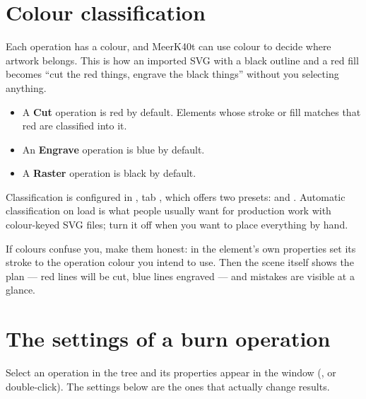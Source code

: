 \section{Colour classification}

Each operation has a colour, and MeerK40t can use colour to decide where artwork
belongs. This is how an imported SVG with a black outline and a red fill becomes
``cut the red things, engrave the black things'' without you selecting anything.

\begin{itemize}
  \item A \textbf{Cut} operation is red by default. Elements whose stroke or fill
        matches that red are classified into it.
  \item An \textbf{Engrave} operation is blue by default.
  \item A \textbf{Raster} operation is black by default.
\end{itemize}

\noindent Classification is configured in
, tab , which offers two
presets:  and . Automatic classification on load is
what people usually want for production work with colour-keyed SVG files;
turn it off when you want to place everything by hand.

\begin{tipbox}
If colours confuse you, make them honest: in the element's own properties set its
stroke to the operation colour you intend to use. Then the scene itself shows the
plan --- red lines will be cut, blue lines engraved --- and mistakes are visible
at a glance.
\end{tipbox}

\section{The settings of a burn operation}

Select an operation in the tree and its properties appear in the 
window (, or double-click). The settings below are the ones
that actually change results.

